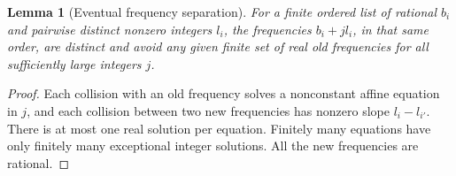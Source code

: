 \documentclass[reqno,a4paper,12pt]{amsart}
\newtheorem{lemma}[theorem]{Lemma}
\theoremstyle{definition}
\begin{document}
\begin{lemma}[Eventual frequency separation]\label{lem:separate-frequencies}
For a finite ordered list of rational $b_i$ and pairwise distinct
nonzero integers $l_i$, the frequencies $b_i+jl_i$, in that same
order, are distinct and avoid any given finite set of real old
frequencies for all sufficiently large integers $j$.
\end{lemma}
\begin{proof}
Each collision with an old frequency solves a nonconstant affine
equation in $j$, and each collision between two new frequencies has
nonzero slope $l_i-l_{i'}$. There is at most one real solution per
equation. Finitely many equations have only finitely many exceptional
integer solutions. All the new frequencies are rational.
\end{proof}
\end{document}
